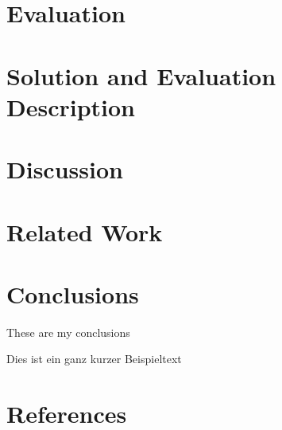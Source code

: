 \documentclass[pdftex,english,oribibl]{llncs}
\begin{document}
\section{Evaluation}\label{sec:evaluation}

\section{Solution and Evaluation Description}\label{sec:solutionEvaluationDescription}

\section{Discussion}\label{sec:discussion}

\section{Related Work}\label{sec:relatedWork}

\section{Conclusions}\label{sec:conclusions}

  These are my conclusions 

Dies ist ein ganz kurzer Beispieltext \cite{AspectJ2007}

\section{References}\label{sec:references}

\end{document}
